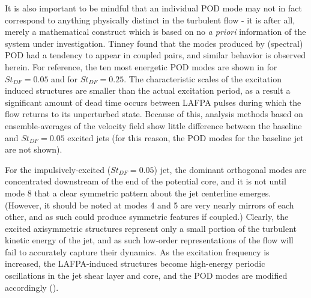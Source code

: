 It is also important to be mindful that an individual POD mode may not in fact correspond to anything physically distinct in the turbulent flow - it is after all, merely a mathematical construct which is based on no \textit{a priori} information of the system under investigation.
Tinney \etal [Tinney2008b] found that the modes produced by (spectral) POD had a tendency to appear in coupled pairs, and similar behavior is observed herein. 
For reference, the ten most energetic POD modes are shown in  for $St_{DF} = 0.05$ and  for $St_{DF} = 0.25$.
The characteristic scales of the excitation induced structures are smaller than the actual excitation period, as a result a significant amount of dead time occurs between LAFPA pulses during which the flow returns to its unperturbed state.
Because of this, analysis methods based on ensemble-averages of the velocity field show little difference between the baseline and $St_{DF} = 0.05$ excited jets (for this reason, the POD modes for the baseline jet are not shown).

For the impulsively-excited ($St_{DF} = 0.05$) jet, the dominant orthogonal modes are concentrated downstream of the end of the potential core, and it is not until mode 8 that a clear symmetric pattern about the jet centerline emerges. 
(However, it should be noted at modes 4 and 5 are very nearly mirrors of each other, and as such could produce symmetric features if coupled.)
Clearly, the excited axisymmetric structures represent only a small portion of the turbulent kinetic energy of the jet, and as such low-order representations of the flow will fail to accurately capture their dynamics.
As the excitation frequency is increased, the LAFPA-induced structures become high-energy periodic oscillations in the jet shear layer and core, and the POD modes are modified accordingly ().

